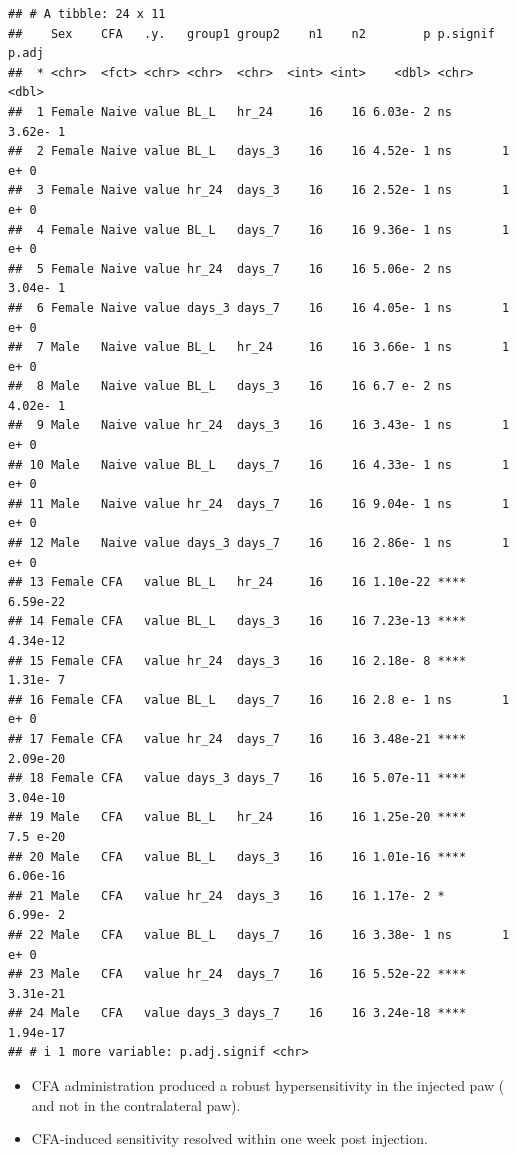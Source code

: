 \documentclass[
]{book}
\begin{document}
\begin{verbatim}
## # A tibble: 24 x 11
##    Sex    CFA   .y.   group1 group2    n1    n2        p p.signif    p.adj
##  * <chr>  <fct> <chr> <chr>  <chr>  <int> <int>    <dbl> <chr>       <dbl>
##  1 Female Naive value BL_L   hr_24     16    16 6.03e- 2 ns       3.62e- 1
##  2 Female Naive value BL_L   days_3    16    16 4.52e- 1 ns       1   e+ 0
##  3 Female Naive value hr_24  days_3    16    16 2.52e- 1 ns       1   e+ 0
##  4 Female Naive value BL_L   days_7    16    16 9.36e- 1 ns       1   e+ 0
##  5 Female Naive value hr_24  days_7    16    16 5.06e- 2 ns       3.04e- 1
##  6 Female Naive value days_3 days_7    16    16 4.05e- 1 ns       1   e+ 0
##  7 Male   Naive value BL_L   hr_24     16    16 3.66e- 1 ns       1   e+ 0
##  8 Male   Naive value BL_L   days_3    16    16 6.7 e- 2 ns       4.02e- 1
##  9 Male   Naive value hr_24  days_3    16    16 3.43e- 1 ns       1   e+ 0
## 10 Male   Naive value BL_L   days_7    16    16 4.33e- 1 ns       1   e+ 0
## 11 Male   Naive value hr_24  days_7    16    16 9.04e- 1 ns       1   e+ 0
## 12 Male   Naive value days_3 days_7    16    16 2.86e- 1 ns       1   e+ 0
## 13 Female CFA   value BL_L   hr_24     16    16 1.10e-22 ****     6.59e-22
## 14 Female CFA   value BL_L   days_3    16    16 7.23e-13 ****     4.34e-12
## 15 Female CFA   value hr_24  days_3    16    16 2.18e- 8 ****     1.31e- 7
## 16 Female CFA   value BL_L   days_7    16    16 2.8 e- 1 ns       1   e+ 0
## 17 Female CFA   value hr_24  days_7    16    16 3.48e-21 ****     2.09e-20
## 18 Female CFA   value days_3 days_7    16    16 5.07e-11 ****     3.04e-10
## 19 Male   CFA   value BL_L   hr_24     16    16 1.25e-20 ****     7.5 e-20
## 20 Male   CFA   value BL_L   days_3    16    16 1.01e-16 ****     6.06e-16
## 21 Male   CFA   value hr_24  days_3    16    16 1.17e- 2 *        6.99e- 2
## 22 Male   CFA   value BL_L   days_7    16    16 3.38e- 1 ns       1   e+ 0
## 23 Male   CFA   value hr_24  days_7    16    16 5.52e-22 ****     3.31e-21
## 24 Male   CFA   value days_3 days_7    16    16 3.24e-18 ****     1.94e-17
## # i 1 more variable: p.adj.signif <chr>
\end{verbatim}

\begin{itemize}
\item
  CFA administration produced a robust hypersensitivity in the injected paw ( and not in the contralateral paw).
\item
  CFA-induced sensitivity resolved within one week post injection.
\end{itemize}

  
\end{document}
